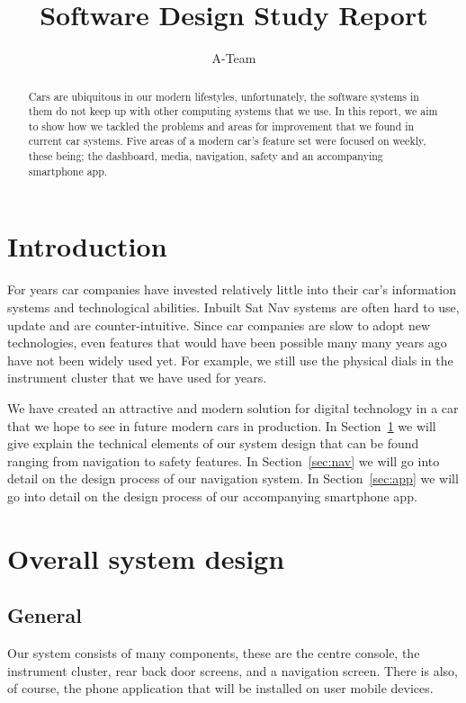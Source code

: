 \documentclass{article}
\title{Software Design Study Report}
\author{A-Team}
\begin{document}
\maketitle


\begin{abstract}
  Cars are ubiquitous in our modern lifestyles, unfortunately, the software systems in them do not keep up with other computing systems that we use. In this report, we aim to show how we tackled the problems and areas for improvement that we found in current car systems. Five areas of a modern car's feature set were focused on weekly, these being; the dashboard, media, navigation, safety and an accompanying smartphone app.
\end{abstract}


\section*{Introduction}
For years car companies have invested relatively little into their car's information systems and technological abilities. Inbuilt Sat Nav systems are often hard to use, update and are counter-intuitive. Since car companies are slow to adopt new technologies, even features that would have been possible many many years ago have not been widely used yet. For example, we still use the physical dials in the instrument cluster that we have used for years.

We have created an attractive and modern solution for digital technology in a car that we hope to see in future modern cars in production. In Section~\ref{sec:system-design} we will give explain the technical elements of our system design that can be found ranging from navigation to safety features. In Section~\ref{sec:nav} we will go into detail on the design process of our navigation system. In Section~\ref{sec:app} we will go into detail on the design process of our accompanying smartphone app.

\section{Overall system design}\label{sec:system-design}
\subsection{General}\label{ssec:system-design-general}
Our system consists of many components, these are the centre console, the instrument cluster, rear back door screens, and a navigation screen. There is also, of course, the phone application that will be installed on user mobile devices.
\end{document}
